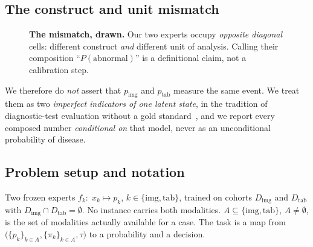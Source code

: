 \documentclass[sigplan,nonacm,screen]{acmart}
\begin{document}
\subsection{The construct and unit mismatch}

\begin{figure}[t]\centering
{}
\caption{\textbf{The mismatch, drawn.} Our two experts occupy \emph{opposite diagonal} cells: different construct \emph{and} different unit of analysis. Calling their composition ``$P(\text{abnormal})$'' is a definitional claim, not a calibration step.}
\label{fig:2x2}
\end{figure}

We therefore do \emph{not} assert that $p_{\mathrm{img}}$ and $p_{\mathrm{tab}}$ measure the same event. We treat them as two \emph{imperfect indicators of one latent state}, in the tradition of diagnostic-test evaluation without a gold standard~\cite{rutjes2007evaluation}, and we report every composed number \emph{conditional on} that model, never as an unconditional probability of disease.

\subsection{Problem setup and notation}

\begin{defbox}
Two frozen experts $f_k:\;x_k\mapsto p_k$, $k\in\{\mathrm{img},\mathrm{tab}\}$, trained on cohorts $D_{\mathrm{img}}$ and $D_{\mathrm{tab}}$ with $D_{\mathrm{img}}\cap D_{\mathrm{tab}}=\emptyset$. No instance carries both modalities. $A\subseteq\{\mathrm{img},\mathrm{tab}\}$, $A\neq\emptyset$, is the set of modalities actually available for a case. The task is a map from $\big(\{p_k\}_{k\in A},\{\pi_k\}_{k\in A},\tau\big)$ to a probability and a decision.
\end{defbox}
\end{document}
